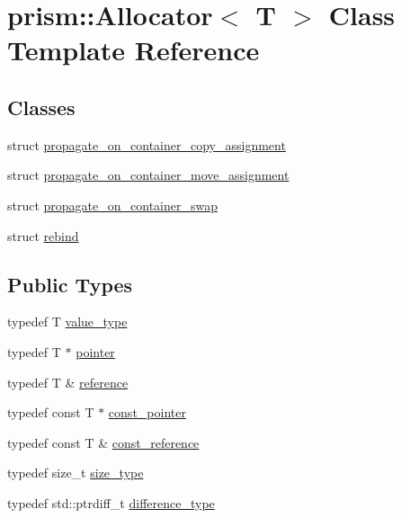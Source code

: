 \hypertarget{classprism_1_1_allocator}{}\section{prism\+:\+:Allocator$<$ T $>$ Class Template Reference}
\label{classprism_1_1_allocator}
\subsection*{Classes}
\begin{DoxyCompactItemize}
\item 
struct \hyperlink{structprism_1_1_allocator_1_1propagate__on__container__copy__assignment}{propagate\+\_\+on\+\_\+container\+\_\+copy\+\_\+assignment}
\item 
struct \hyperlink{structprism_1_1_allocator_1_1propagate__on__container__move__assignment}{propagate\+\_\+on\+\_\+container\+\_\+move\+\_\+assignment}
\item 
struct \hyperlink{structprism_1_1_allocator_1_1propagate__on__container__swap}{propagate\+\_\+on\+\_\+container\+\_\+swap}
\item 
struct \hyperlink{structprism_1_1_allocator_1_1rebind}{rebind}
\end{DoxyCompactItemize}
\subsection*{Public Types}
\begin{DoxyCompactItemize}
\item 
typedef T \hyperlink{classprism_1_1_allocator_a45426ee64e0aba097a532e0ef5ff5700}{value\+\_\+type}
\item 
typedef T $\ast$ \hyperlink{classprism_1_1_allocator_ad3c6706a7243bd3ef489e16d34d5750f}{pointer}
\item 
typedef T \& \hyperlink{classprism_1_1_allocator_a5dde9876d2ed0ca292d8a2019ac2836f}{reference}
\item 
typedef const T $\ast$ \hyperlink{classprism_1_1_allocator_af6a4a91dfc203203ecc319a457ce4dce}{const\+\_\+pointer}
\item 
typedef const T \& \hyperlink{classprism_1_1_allocator_a89911899c97ae877a81b798957a2d899}{const\+\_\+reference}
\item 
typedef size\+\_\+t \hyperlink{classprism_1_1_allocator_a47cb9435e4e9ff4c934ea3d4b4338d52}{size\+\_\+type}
\item 
typedef std\+::ptrdiff\+\_\+t \hyperlink{classprism_1_1_allocator_a39ca38c4c741bbc51d3c6e26603102ef}{difference\+\_\+type}
\end{DoxyCompactItemize}
